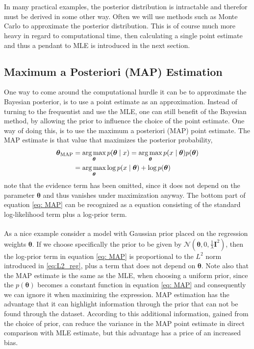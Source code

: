 \\
\\
In many practical examples, the posterior distribution is intractable and therefor must be derived in some other way. Often we will use methods such as Monte Carlo to approximate the posterior distribution. This is of course much more heavy in regard to computational time, then calculating a single point estimate and thus a pendant to MLE is introduced in the next section.

\subsection{Maximum a Posteriori (MAP) Estimation}
One way to come around the computational hurdle it can be to approximate the Bayesian posterior, is to use a point estimate as an approximation. Instead of turning to the frequentist and use the MLE, one can still benefit of the Bayesian method, by allowing the prior to influence the choice of the point estimate. One way of doing this, is to use the maximum a posteriori (MAP) point estimate. The MAP estimate is that value that maximizes the posterior probability,
\begin{equation}\label{eq: MAP}
  \begin{split}
        \boldsymbol{\theta}_{\text{MAP}}&=\operatorname*{arg\,max}_{\boldsymbol{\theta}}{p(\boldsymbol{\theta}\mid x})=\operatorname*{arg\,max}_{\boldsymbol{\theta}}{p(x\mid \boldsymbol{\theta}}) p(\boldsymbol{\theta})\\
        &=\operatorname*{arg\,max}_{\boldsymbol{\theta}}{\log p(x\mid \boldsymbol{\theta}})+ \log p(\boldsymbol{\theta})
  \end{split}
\end{equation}
note that the evidence term has been omitted, since it does not depend on the parameter $\boldsymbol{\theta}$ and thus vanishes under maximization anyway. The bottom part of equation \ref{eq: MAP} can be recognized as a equation consisting of the standard log-likelihood term plus a log-prior term. \\
\\
As a nice example consider a model with Gaussian prior placed on the regression weights $\boldsymbol{\theta}$. If we choose specifically the prior to be given by $\mathcal{N}\left(\boldsymbol{\theta},0,\frac{1}{\lambda}\boldsymbol{I}^2\right)$, then the log-prior term in equation \ref{eq: MAP} is proportional to the $L^2$ norm introduced in \ref{eq:L2_reg}, plus a term that does not depend on $\boldsymbol{\theta}$.
Note also that the MAP estimate is the same as the MLE, when choosing a uniform prior, since the $p(\boldsymbol{\theta})$ becomes a constant function in equation \ref{eq: MAP} and consequently we can ignore it when maximizing the expression. MAP estimation has the advantage that it can highlight information through the prior that can not be found through the dataset. According to \cite{Goodfellow-et-al-2016} this additional information, gained from the choice of prior, can reduce the variance in the MAP point estimate in direct comparison with MLE estimate, but this advantage has a price of an increased bias.\\

